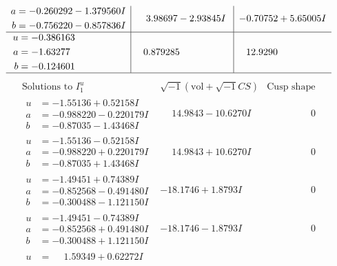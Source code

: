 \documentclass[1p]{elsarticle_modified}
\theoremstyle{definition}
\newcommand{\I}{\sqrt{-1}}
\begin{document}
$$\begin{array}{c|c|c}
\begin{aligned}
a &= -0.260292 - 1.379560 I \\
b &= -0.756220 - 0.857836 I\end{aligned}
 & \phantom{-}3.98697 - 2.93845 I & -0.70752 + 5.65005 I \\ \hline\begin{aligned}
u &= -0.386163\phantom{ +0.000000I} \\
a &= -1.63277\phantom{ +0.000000I} \\
b &= -0.124601\phantom{ +0.000000I}\end{aligned}
 & \phantom{-}0.879285\phantom{ +0.000000I} & \phantom{-}12.9290\phantom{ +0.000000I}\\
 \hline 
 \end{array}$$\newpage$$\begin{array}{c|c|c}  
\text{Solutions to }I^u_{1}& \I (\text{vol} + \sqrt{-1}CS) & \text{Cusp shape}\\
 \hline 
\begin{aligned}
u &= -1.55136 + 0.52158 I \\
a &= -0.988220 - 0.220179 I \\
b &= -0.87035 - 1.43468 I\end{aligned}
 & \phantom{-}14.9843 - 10.6270 I & \phantom{-0.000000 } 0 \\ \hline\begin{aligned}
u &= -1.55136 - 0.52158 I \\
a &= -0.988220 + 0.220179 I \\
b &= -0.87035 + 1.43468 I\end{aligned}
 & \phantom{-}14.9843 + 10.6270 I & \phantom{-0.000000 } 0 \\ \hline\begin{aligned}
u &= -1.49451 + 0.74389 I \\
a &= -0.852568 - 0.491480 I \\
b &= -0.300488 - 1.121150 I\end{aligned}
 & -18.1746 + 1.8793 I & \phantom{-0.000000 } 0 \\ \hline\begin{aligned}
u &= -1.49451 - 0.74389 I \\
a &= -0.852568 + 0.491480 I \\
b &= -0.300488 + 1.121150 I\end{aligned}
 & -18.1746 - 1.8793 I & \phantom{-0.000000 } 0 \\ \hline\begin{aligned}
u &= \phantom{-}1.59349 + 0.62272 I \\

\end{aligned}
\end{array}$$
\end{document}
